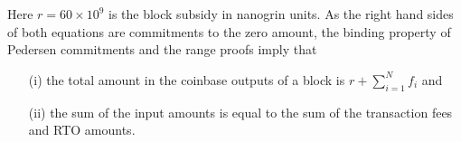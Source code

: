 Here $r = 60\times 10^9$ is the block subsidy in nanogrin units.
As the right hand sides of both equations are commitments to the zero amount, the binding property of Pedersen commitments and the range proofs imply that
\begin{enumerate}
  \item[(i)] the total amount in the coinbase outputs of a block is $r + \sum_{i=1}^{N} f_i$ and
  \item [(ii)] the sum of the input amounts is equal to the sum of the transaction fees and RTO amounts.
\end{enumerate}
%

